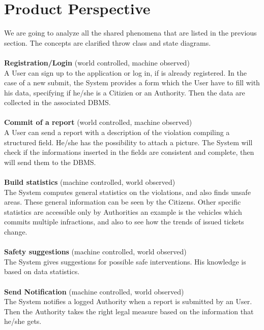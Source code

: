 \documentclass{report}
\begin{document}
\section{Product Perspective}
We are going to analyze all the shared phenomena that are listed in the previous section. The concepts are clarified throw class and state diagrams.\\
\\
\textbf{Registration/Login} (world controlled, machine observed)\\
A User can sign up to the application or log in, if is already registered. 
In the case of a new submit, the System provides a form which the User have to fill with his data, specifying if he/she is 
a Citizien or an Authority. Then the data are collected in the associated DBMS.\\
\\
\textbf{Commit of a report} (world controlled, machine observed)\\
A User can send a report with a description of the violation compiling a structured field. He/she has the possibility to  attach a picture. The System will check if the informations inserted in the fields are consistent and complete, then will send them to the
DBMS.\\
\\
\textbf{Build statistics} (machine controlled, world observed)\\
The System computes general statistics on the violations, and also finds unsafe areas. These general information can be seen by the Citizens. Other specific statistics are accessible only by Authorities an example is
the vehicles which commits multiple infractions, and also to see how the trends of issued tickets change. \\
\\
\textbf{Safety suggestions} (machine controlled, world observed)\\
The System gives suggestions for possible safe interventions. His knowledge is based on data statistics.\\
\\
\textbf{Send Notification} (machine controlled, world observed)\\
The System notifies a logged Authority when a report is submitted by an User. 
Then the Authority takes the right legal measure based on the information that he/she gets.
\end{document}
